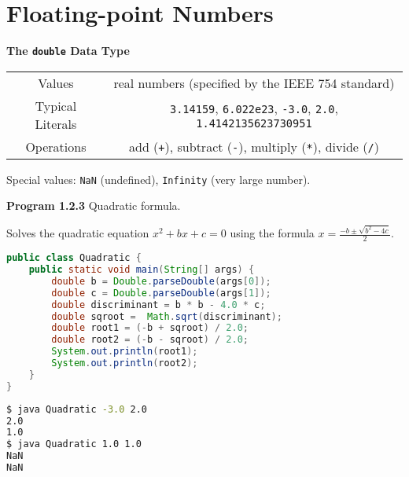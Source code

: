 \documentclass[8pt,a4paper,compress]{beamer}
\begin{document}
\section{Floating-point Numbers}
\begin{frame}[fragile]
\pause

\textbf{The \lstinline$double$ Data Type}
\begin{center}
\begin{tabular}{c|c}
Values & real numbers (specified by the IEEE 754 standard) \\ 
Typical Literals & \lstinline$3.14159$, \lstinline$6.022e23$, \lstinline$-3.0$, \lstinline$2.0$, \lstinline$1.4142135623730951$ \\ 
Operations & add (\lstinline$+$), subtract (\lstinline$-$), multiply (\lstinline$*$), divide (\lstinline$/$) \\ 
\end{tabular} 
\end{center}

Special values: \lstinline$NaN$ (undefined), \lstinline$Infinity$ (very large number).

\pause
\smallskip

\textbf{Program 1.2.3} Quadratic formula. 

\begin{framed}
\tiny Solves the quadratic equation $x^2+bx+c=0$ using the formula $x=\frac{-b\pm \sqrt{b^2-4c}}{2}$.
\end{framed}

\begin{lstlisting}[language=Java]
public class Quadratic { 
    public static void main(String[] args) { 
        double b = Double.parseDouble(args[0]);
        double c = Double.parseDouble(args[1]);
        double discriminant = b * b - 4.0 * c;
        double sqroot =  Math.sqrt(discriminant);
        double root1 = (-b + sqroot) / 2.0;
        double root2 = (-b - sqroot) / 2.0;
        System.out.println(root1);
        System.out.println(root2);
    }
}
\end{lstlisting}

\pause

\begin{lstlisting}[language=bash]
$ java Quadratic -3.0 2.0
2.0
1.0
$ java Quadratic 1.0 1.0
NaN
NaN
\end{lstlisting}
\end{frame}
\end{document}
